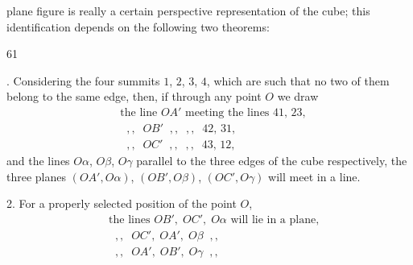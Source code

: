 \documentclass[11pt]{article}
\begin{document}
\medskip
plane figure is really a certain perspective representation of the cube; this identification depends on the following two theorems:

\hfill 61

\newpage

. Considering the four summits $1$, $2$, $3$, $4$, which are such that no two of them belong to the same edge, then, if through any point $O$ we draw
\begin{align*}
& \text{the line } OA' \text{ meeting the lines } 41,\, 23,\\
& \;\; ,, \;\; OB' \;\; ,, \;\; ,, \;\; 42,\, 31,\\
& \;\; ,, \;\; OC' \;\; ,, \;\; ,, \;\; 43,\, 12,
\end{align*}
and the lines $O\alpha$, $O\beta$, $O\gamma$ parallel to the three edges of the cube respectively, the three planes $(OA', O\alpha)$, $(OB', O\beta)$, $(OC', O\gamma)$ will meet in a line.

2. For a properly selected position of the point $O$,
\begin{align*}
& \text{the lines } OB',\; OC',\; O\alpha \text{ will lie in a plane,}\\
& \;\; ,, \;\; OC',\; OA',\; O\beta \;\; ,,\\
& \;\; ,, \;\; OA',\; OB',\; O\gamma \;\; ,,
\end{align*}
\end{document}
